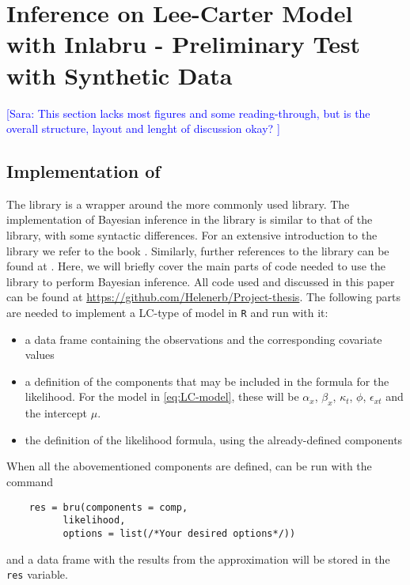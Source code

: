 \newpage
\section{Inference on Lee-Carter Model with Inlabru - Preliminary Test with Synthetic Data}
\textcolor{blue}{[Sara: This section lacks most figures and some reading-through, but is the overall structure, layout and lenght of discussion okay? ]}
\subsection{Implementation of \inlabru}
The \inlabru library is a wrapper around the more commonly used \rinla library. The implementation of Bayesian inference in the \inlabru library is similar to that of the \rinla library, with some syntactic differences. For an extensive introduction to the \rinla library we refer to the book \cite{Rubio2020}. Similarly, further references to the \inlabru library can be found at \cite{Inlabru}. Here, we will briefly cover the main parts of code needed to use the \inlabru library to perform Bayesian inference. All code used and discussed in this paper can be found at \url{https://github.com/Helenerb/Project-thesis}. 
\newline
\noindent The following parts are needed to implement a LC-type of model in \texttt{R} and run \inlabru with it:
\begin{itemize}
    \item a data frame containing the observations and the corresponding covariate values
    \item a definition of the components that may be included in the formula for the likelihood. For the model in \ref{eq:LC-model}, these will be $\alpha_x$, $\beta_x$, $\kappa_t$, $\phi$, $\epsilon_{xt}$ and the intercept $\mu$.
    \item the definition of the likelihood formula, using the already-defined components
\end{itemize}
When all the abovementioned components are defined, \inlabru can be run with the command 
\begin{verbatim}
    res = bru(components = comp,
          likelihood, 
          options = list(/*Your desired options*/))
\end{verbatim}
and a data frame with the results from the approximation will be stored in the \texttt{res} variable. 
\newline
